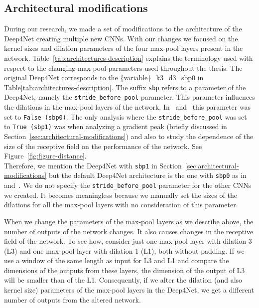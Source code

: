 \subsection{Architectural modifications}\label{subsec:architectural-modifications}
During our research, we made a set of modifications to the architecture of the Deep4Net creating multiple new CNNs.
With our changes we focused on the kernel sizes and dilation parameters of the four max-pool layers present in the network.
Table~\ref{tab:architectures-description} explains the terminology used with respect to the changing max-pool parameters used throughout the thesis.
The original Deep4Net corresponds to the \{variable\}\_k3\_d3\_sbp0 in Table\ref{tab:architectures-description}.
The suffix \texttt{sbp} refers to a parameter of the Deep4Net, namely the \texttt{stride\_before\_pool} parameter.
This parameter influences the dilations in the max-pool layers of the network.
In~\cite{Hammer-2021} and~\cite{schirrmeister-deep-2017} this parameter was set to \texttt{False (sbp0)}.
The only analysis where the \texttt{stride\_before\_pool} was set to \texttt{True (sbp1)} was when analyzing a gradient peak (briefly discussed in Section~\ref{sec:architectural-modifications}) and also to study the dependence of the size of the receptive field on the performance of the network.
See Figure~\ref{fig:figure-distance}. \\

Therefore, we mention the Deep4Net with \texttt{sbp1} in Section~\ref{sec:architectural-modifications} but the default Deep4Net architecture is the one with \texttt{sbp0} as in~\cite{Hammer-2021} and~\cite{schirrmeister-deep-2017}.
We do not specify the \texttt{stride\_before\_pool} parameter for the other CNNs we created. It becomes meaningless because we manually set the sizes of the dilations for all the max-pool layers with no consideration of this parameter.

When we change the parameters of the max-pool layers as we describe above, the number of outputs of the network changes.
It also causes changes in the receptive field of the network.
To see how, consider just one max-pool layer with dilation 3 (L3) and one max-pool layer with dilation 1 (L1), both without padding.
If we use a window of the same length as input for L3 and L1 and compare the dimensions of the outputs from these layers, the dimension of the output of L3 will be smaller than of the L1.
Consequently, if we alter the dilation (and also kernel size) parameters of the max-pool layers in the Deep4Net, we get a different number of outputs from the altered network.

